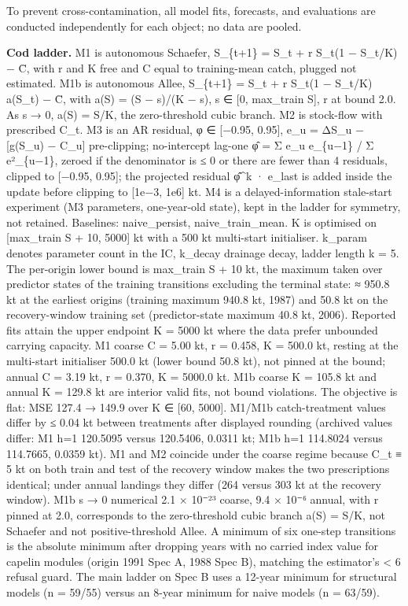 \documentclass[11pt]{article}
\begin{document}
To prevent cross-contamination, all model fits, forecasts, and
evaluations are conducted independently for each object; no data are
pooled.

\textbf{Cod ladder.} M1 is autonomous Schaefer, S\_\{t+1\} = S\_t + r
S\_t(1 − S\_t/K) − C̄, with r and K free and C equal to training-mean
catch, plugged not estimated. M1b is autonomous Allee, S\_\{t+1\} = S\_t
+ r S\_t(1 − S\_t/K) a(S\_t) − C̄, with a(S) = (S − s)/(K − s), s ∈ {[}0,
max\_train S{]}, r at bound 2.0. As s → 0, a(S) = S/K, the
zero-threshold cubic branch. M2 is stock-flow with prescribed C\_t. M3
is an AR residual, φ ∈ {[}−0.95, 0.95{]}, e\_u = ΔS\_u − {[}g(S\_u) −
C\_u{]} pre-clipping; no-intercept lag-one φ̂ = Σ e\_u e\_\{u−1\} / Σ
e²\_\{u−1\}, zeroed if the denominator is ≤ 0 or there are fewer than 4
residuals, clipped to {[}−0.95, 0.95{]}; the projected residual φ̂\^{}k ·
e\_last is added inside the update before clipping to {[}1e−3, 1e6{]}
kt. M4 is a delayed-information stale-start experiment (M3 parameters,
one-year-old state), kept in the ladder for symmetry, not retained.
Baselines: naive\_persist, naive\_train\_mean. K is optimised on
{[}max\_train S + 10, 5000{]} kt with a 500 kt multi-start initialiser.
k\_param denotes parameter count in the IC, k\_decay drainage decay,
ladder length k = 5. The per-origin lower bound is max\_train S + 10 kt,
the maximum taken over predictor states of the training transitions
excluding the terminal state: ≈ 950.8 kt at the earliest origins
(training maximum 940.8 kt, 1987) and 50.8 kt on the recovery-window
training set (predictor-state maximum 40.8 kt, 2006). Reported fits
attain the upper endpoint K = 5000 kt where the data prefer unbounded
carrying capacity. M1 coarse C = 5.00 kt, r = 0.458, K = 500.0 kt,
resting at the multi-start initialiser 500.0 kt (lower bound 50.8 kt),
not pinned at the bound; annual C = 3.19 kt, r = 0.370, K = 5000.0 kt.
M1b coarse K = 105.8 kt and annual K = 129.8 kt are interior valid fits,
not bound violations. The objective is flat: MSE 127.4 → 149.9 over K ∈
{[}60, 5000{]}. M1/M1b catch-treatment values differ by ≤ 0.04 kt
between treatments after displayed rounding (archived values differ: M1
h=1 120.5095 versus 120.5406, 0.0311 kt; M1b h=1 114.8024 versus
114.7665, 0.0359 kt). M1 and M2 coincide under the coarse regime because
C\_t ≡ 5 kt on both train and test of the recovery window makes the two
prescriptions identical; under annual landings they differ (264 versus
303 kt at the recovery window). M1b s → 0 numerical 2.1 × 10⁻²³ coarse,
9.4 × 10⁻⁶ annual, with r pinned at 2.0, corresponds to the
zero-threshold cubic branch a(S) = S/K, not Schaefer and not
positive-threshold Allee. A minimum of six one-step transitions is the
absolute minimum after dropping years with no carried index value for
capelin modules (origin 1991 Spec A, 1988 Spec B), matching the
estimator's \textless{} 6 refusal guard. The main ladder on Spec B uses
a 12-year minimum for structural models (n = 59/55) versus an 8-year
minimum for naive models (n = 63/59).
\end{document}
